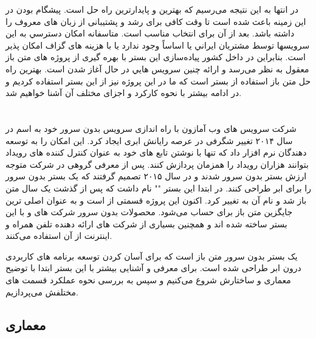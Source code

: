 در انتها به این نتیجه می‌رسیم که بهترین و پایدارترین راه حل  است. پیشگام بودن در این زمینه باعث شده است تا وقت کافی برای رشد و پشتیبانی از زبان های معروف را داشته باشد. بعد از آن  برای انتخاب مناسب است. متاسفانه امكان دسترسي به اين سرويسها توسط مشتريان ايراني يا اساساً وجود ندارد يا با هزينه های گزاف امكان پذير است. بنابراین در داخل کشور پیاده‌سازی این بستر با بهره گیری از پروژه های متن باز معقول به نظر می‌رسد و ارائه چنين سرويس هايي در حال آغاز شدن است. بهترین راه حل متن باز استفاده از بستر  است که ما در این پروژه نیز از این بستر استفاده کردیم و در ادامه بیشتر با نحوه کارکرد و اجزای مختلف آن آشنا خواهیم شد.

\section{}

شرکت سرویس های وب آمازون با راه اندازی سرویس بدون سرور خود به اسم  در سال ۲۰۱۴ تغییر شگرفی در عرصه رایانش ابری ایجاد کرد.  این امکان را به توسعه دهندگان نرم افزار داد که تنها با نوشتن تابع های خود به عنوان کنترل کننده های رویداد بتوانند هزاران رویداد را همزمان پردازش کنند. پس از معرفی  گروهی در شرکت  متوجه ارزش بستر بدون سرور شدند و در سال ۲۰۱۵ تصمیم گرفتند که یک بستر بدون سرور را برای ابر  طراحی کنند. در ابتدا این بستر "" نام داشت که پس از گذشت یک سال متن باز شد و نام آن به  تغییر کرد. اکنون این پروژه قسمتی از  است و به عنوان اصلی ترین جایگزین متن باز برای  حساب می‌شود. محصولات بدون سرور شرکت های  و  با این بستر ساخته شده اند و همچنین بسیاری از شرکت های ارائه دهنده تلفن همراه و اینترنت از آن استفاده می‌کنند.

 یک بستر بدون سرور متن باز است که برای آسان کردن توسعه برنامه های کاربردی درون ابر طراحی شده است. برای معرفی و آشنایی بیشتر با این بستر ابتدا با توضیح معماری و ساختارش شروع می‌کنیم و سپس به بررسی نحوه عملکرد قسمت های مختلفش می‌پردازیم.

\subsection{معماری }

